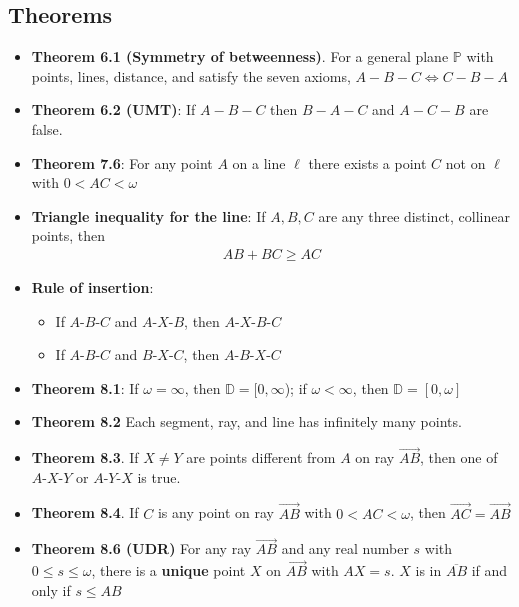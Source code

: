 \documentclass{report}
\begin{document}
    \pagebreak 
    \subsection{Theorems}
    \begin{itemize}
        \item \textbf{Theorem 6.1 (Symmetry of betweenness)}. For a general plane $\mathbb{P}$ with points, lines, distance, and satisfy the seven axioms, $A-B-C \iff C-B-A$
        \item \textbf{Theorem 6.2 (UMT)}: If $A-B-C$ then $B-A-C$ and $A-C-B$ are false.
        \item \textbf{Theorem 7.6}: For any point $A$ on a line $\ell$ there exists a point $C$ not on $\ell$ with $0 < AC <\omega$ 
    \item \textbf{Triangle inequality for the line}: If $A,B,C$ are any three distinct, collinear points, then 
        \begin{align*}
            AB + BC \geq AC 
        \end{align*}
    \item \textbf{Rule of insertion}: 
        \begin{itemize}
            \item If $ A\text{-}B\text{-}C$ and $ A\text{-}X\text{-}B$, then $ A\text{-}X\text{-}B\text{-}C $
            \item If $ A\text{-}B\text{-}C$ and $ B\text{-}X\text{-}C$, then $ A\text{-}B\text{-}X\text{-}C $
        \end{itemize}
        \item \textbf{Theorem 8.1}: If $\omega = \infty$, then $\mathbb{D} = [0,\infty$); if $\omega < \infty$, then $\mathbb{D} = [0,\omega] $
        \item \textbf{Theorem 8.2} Each segment, ray, and line has infinitely many points.
        \item \textbf{Theorem 8.3}. If $X \ne Y$ are points different from $A$ on ray $\overrightarrow{AB}$, then one of $ A\text{-}X\text{-}Y$ or $ A\text{-}Y\text{-}X$ is true.
        \item \textbf{Theorem 8.4}. If $C$ is any point on ray $ \overrightarrow{AB}$ with $ 0 < AC < \omega$, then $ \overrightarrow{AC} = \overrightarrow{AB} $
        \item \textbf{Theorem 8.6 (UDR)} For any ray $ \overrightarrow{AB}$ and any real number $s$ with $0 \leq s \leq \omega$, there is a \textbf{unique} point $X$ on $\overrightarrow{AB}$ with $AX = s$. $X$ is in $\overline{AB}$ if and only if $s \leq   AB $

\end{itemize}
\end{document}

